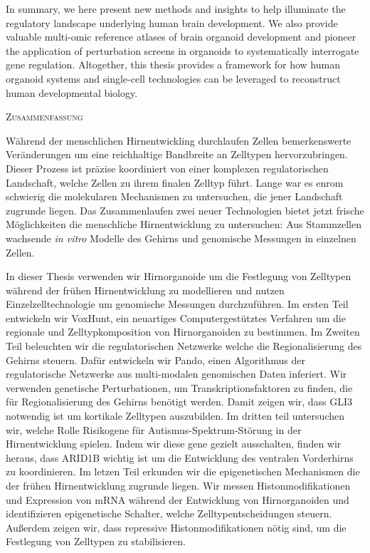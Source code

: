 In summary, we here present new methods and insights to help illuminate the regulatory landscape underlying human brain development. We also provide valuable multi-omic reference atlases of brain organoid development and pioneer the application of perturbation screens in organoids to systematically interrogate gene regulation. Altogether, this thesis provides a framework for how human organoid systems and single-cell technologies can be leveraged to reconstruct human developmental biology.


\clearpage

\begin{center}
    \large\textsc{Zusammenfassung}
\end{center}

Während der menschlichen Hirnentwickling durchlaufen Zellen bemerkenswerte Veränderungen um eine reichhaltige Bandbreite an Zelltypen hervorzubringen. Dieser Prozess ist präzise koordiniert von einer komplexen regulatorischen Landschaft, welche Zellen zu ihrem finalen Zelltyp führt. Lange war es enrom schwierig die molekularen Mechanismen zu untersuchen, die jener Landschaft zugrunde liegen. Das Zusammenlaufen zwei neuer Technologien bietet jetzt frische Möglichkeiten die menschliche Hirnentwicklung zu untersuchen: Aus Stammzellen wachsende \textit{in vitro} Modelle des Gehirns und genomische Messungen in einzelnen Zellen.

In dieser Thesis verwenden wir Hirnorganoide um die Festlegung von Zelltypen während der frühen Hirnentwicklung zu modellieren und nutzen Einzelzelltechnologie um genomische Messungen durchzuführen. Im ersten Teil entwickeln wir VoxHunt, ein neuartiges Computergestütztes Verfahren um die regionale und Zelltypkomposition von Hirnorganoiden zu bestimmen. Im Zweiten Teil beleuchten wir die regulatorischen Netzwerke welche die Regionalisierung des Gehirns steuern. Dafür entwickeln wir Pando, einen Algorithmus der regulatorische Netzwerke aus multi-modalen genomischen Daten inferiert. Wir verwenden genetische Perturbationen, um Transkriptionsfaktoren zu finden, die für Regionalisierung des Gehirns benötigt werden. Damit zeigen wir, dass GLI3 notwendig ist um kortikale Zelltypen auszubilden. Im dritten teil untersuchen wir, welche Rolle Risikogene für Autismus-Spektrum-Störung in der Hirnentwicklung spielen. Indem wir diese gene gezielt ausschalten, finden wir heraus, dass ARID1B wichtig ist um die Entwicklung des ventralen Vorderhirns zu koordinieren. Im letzen Teil erkunden wir die epigenetischen Mechanismen die der frühen Hirnentwicklung zugrunde liegen. Wir messen Histonmodifikationen und Expression von mRNA während der Entwicklung von Hirnorganoiden und identifizieren epigenetische Schalter, welche Zelltypentscheidungen steuern. Außerdem zeigen wir, dass repressive Histonmodifikationen nötig sind, um die Festlegung von Zelltypen zu stabilisieren. 

